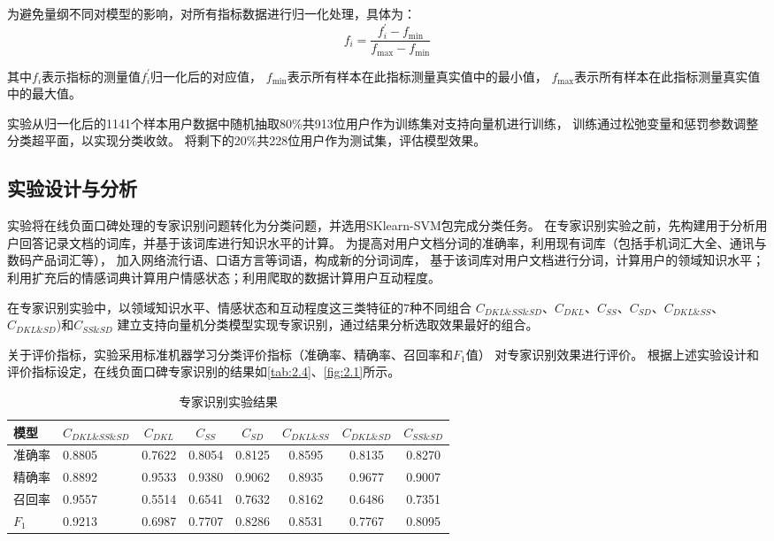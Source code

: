 为避免量纲不同对模型的影响，对所有指标数据进行归一化处理，具体为：
\begin{equation}\label{eq:2.4}
    f_i=\frac{f^{'}_i - f_{\min}}{f_{\max}-f_{\min}}
\end{equation}

其中$f_i$表示指标的测量值$f^{'}_i$归一化后的对应值，
$f_{\min}$表示所有样本在此指标测量真实值中的最小值，
$f_{\max}$表示所有样本在此指标测量真实值中的最大值。

实验从归一化后的1141个样本用户数据中随机抽取80\%共913位用户作为训练集对支持向量机进行训练，
训练通过松弛变量和惩罚参数调整分类超平面，以实现分类收敛。
将剩下的20\%共228位用户作为测试集，评估模型效果。

\subsection{实验设计与分析}\label{subsection:2.3.2}
实验将在线负面口碑处理的专家识别问题转化为分类问题，并选用SKlearn-SVM包完成分类任务。
在专家识别实验之前，先构建用于分析用户回答记录文档的词库，并基于该词库进行知识水平的计算。
为提高对用户文档分词的准确率，利用现有词库（包括手机词汇大全、通讯与数码产品词汇等），
加入网络流行语、口语方言等词语，构成新的分词词库，
基于该词库对用户文档进行分词，计算用户的领域知识水平；
利用扩充后的情感词典计算用户情感状态；利用爬取的数据计算用户互动程度。

在专家识别实验中，以领域知识水平、情感状态和互动程度这三类特征的7种不同组合
$C_{DKL \& SS \& SD}$、$C_{DKL}$、$C_{SS}$、$C_{SD}$、$C_{DKL \& SS}$、$C_{DKL \& SD}$)和$C_{SS \& SD}$
建立支持向量机分类模型实现专家识别，通过结果分析选取效果最好的组合。

关于评价指标，实验采用标准机器学习分类评价指标（准确率、精确率、召回率和$F_1$值）
对专家识别效果进行评价。
根据上述实验设计和评价指标设定，在线负面口碑专家识别的结果如\autoref{tab:2.4}、\autoref{fig:2.1}所示。
\begin{table}[ht]
    \centering
    \caption{专家识别实验结果}\label{tab:2.4}
    \vskip -10pt
    \begin{tabularx}{\textwidth}{lYcccccc}
    \toprule
    模型 & $C_{DKL \& SS \& SD}$ & $C_{DKL}$ & $C_{SS}$ & $C_{SD}$ & $C_{DKL \& SS}$ & $C_{DKL \& SD}$ & $C_{SS \& SD}$ \\
    \midrule
    准确率 & 0.8805 & 0.7622 & 0.8054 & 0.8125 & 0.8595 & 0.8135 & 0.8270  \\
    精确率 & 0.8892 & 0.9533 & 0.9380 & 0.9062 & 0.8935 & 0.9677 & 0.9007  \\
    召回率 & 0.9557 & 0.5514 & 0.6541 & 0.7632 & 0.8162 & 0.6486 & 0.7351  \\
    $F_1$ & 0.9213 & 0.6987 & 0.7707 & 0.8286 & 0.8531 & 0.7767 & 0.8095  \\
    \bottomrule
    \end{tabularx}
\end{table}

